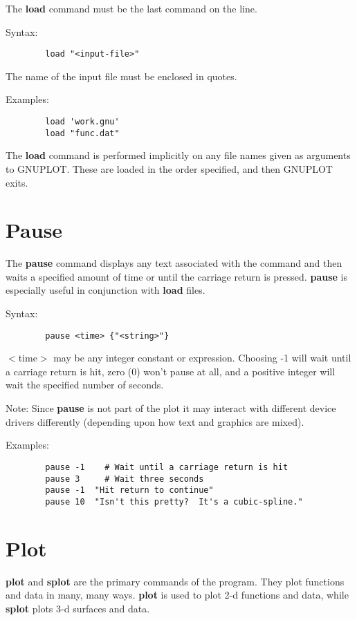 The {\bf load} command must be the last command on the line.

Syntax:
\begin{verbatim}
        load "<input-file>"
\end{verbatim}

The name of the input file must be enclosed in quotes.

Examples:

\begin{verbatim}
        load 'work.gnu'
        load "func.dat"
\end{verbatim}

The {\bf load} command is performed implicitly on any file names given as
arguments to GNUPLOT. These are loaded in the order specified, and
then GNUPLOT exits.
\section{Pause}
The {\bf pause} command displays any text associated with the command and
then waits a specified amount of time or until the carriage return is
pressed.  {\bf pause} is especially useful in conjunction with {\bf load} files.

Syntax:
\begin{verbatim}
        pause <time> {"<string>"}
\end{verbatim}

$<$time$>$ may be any integer constant or expression. Choosing -1 will
wait until a carriage return is hit, zero (0) won't pause at all, and
a positive integer will wait the specified number of seconds.

Note: Since {\bf pause} is not part of the plot it may interact with
different device drivers differently (depending upon how text and
graphics are mixed).

Examples:
\begin{verbatim}
        pause -1    # Wait until a carriage return is hit
        pause 3     # Wait three seconds
        pause -1  "Hit return to continue"
        pause 10  "Isn't this pretty?  It's a cubic-spline."
\end{verbatim}

\section{Plot}
{\bf plot} and {\bf splot} are the primary commands of the program. They plot
functions and data in many, many ways. {\bf plot} is used to plot 2-d
functions and data, while {\bf splot} plots 3-d surfaces and data.

